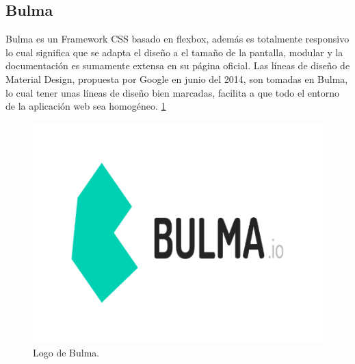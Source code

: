 \subsection{Bulma}
Bulma es un Framework CSS basado en flexbox, además es totalmente responsivo lo cual significa que se adapta el diseño a el tamaño de la pantalla, modular y la documentación es sumamente extensa en su página oficial.
Las líneas de diseño de Material Design, propuesta por Google en junio del 2014, son tomadas en Bulma, lo cual tener unas líneas de diseño bien marcadas, facilita a que todo el entorno de la aplicación web sea homogéneo.\cite{Bulma} \ref{figura11}
\begin{figure}[h]
  \label{figura11}
  \centering
  \includegraphics[scale=1]{lib/assets/11}
  \caption{Logo de Bulma.}
\end{figure}


